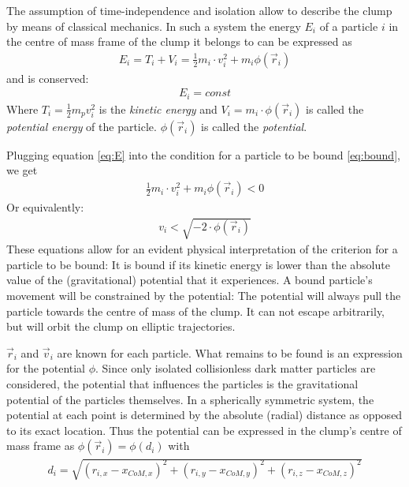 The assumption of time-independence and isolation allow to describe the clump by means of classical mechanics.
In such a system the energy $E_i$ of a particle $i$ in the centre of mass frame of the clump it belongs to can be expressed as 
\begin{align}
	E_i = T_i + V_i = \frac{1}{2} m_i \cdot v^2_i + m_i \phi (\vec{r}_i)\label{eq:E}
\end{align}
%
and is conserved:
\begin{align}
	E_i = const
\end{align}
Where $T_i = \tfrac{1}{2}m_p v_i^2$ is the \emph{kinetic energy} and $V_i = m_i \cdot \phi(\vec{r}_i)$ is called the \emph{potential energy} of the particle. 
$\phi(\vec{r}_i)$ is called the \emph{potential}.

Plugging equation \eqref{eq:E} into the condition for a particle to be bound \eqref{eq:bound}, we get
%
\begin{align}
	\frac{1}{2} m_i \cdot v_i^2 + m_i \phi(\vec{r}_i) < 0
\end{align}
%
Or equivalently:
%
\begin{align}
	v_i < \sqrt{- 2 \cdot \phi(\vec{r}_i)} \label{eq:boundv}
\end{align}
%
These equations allow for an evident physical interpretation of the criterion for a particle to be bound:
It is bound if its kinetic energy is lower than the absolute value of the (gravitational) potential that it experiences. 
A bound particle's movement will be constrained by the potential:
The potential will always pull the particle towards the centre of mass of the clump. 
It can not escape arbitrarily, but will orbit the clump on elliptic trajectories.
%
%


$\vec{r}_i$ and $\vec{v}_i$ are known for each particle.
What remains to be found is an expression for the potential $\phi$.
Since only isolated collisionless dark matter particles are considered, the potential that influences the particles is the gravitational potential of the particles themselves.
In a spherically symmetric system, the potential at each point is determined by the absolute (radial) distance as opposed to its exact location.
Thus the potential can be expressed in the clump's centre of mass frame as $\phi(\vec{r}_i) = \phi(d_i)$ with 
\begin{align}
	d_i = \sqrt{(r_{i,x}-x_{CoM,x})^2 + (r_{i,y}-x_{CoM,y})^2 + (r_{i,z}-x_{CoM,z})^2}
\end{align}

